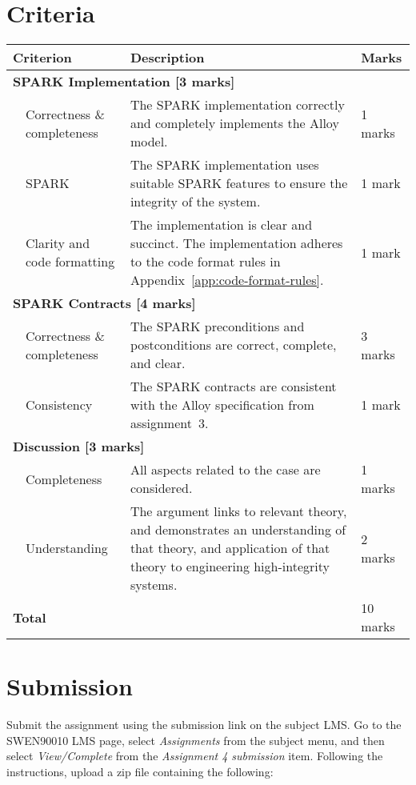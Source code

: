 \documentclass[a4paper,11pt]{article}
\begin{document}
\section{Criteria}

\begin{center}
\begin{tabular}{p{0.5cm}p{3cm}p{10cm}l}
\toprule
 \multicolumn{2}{l}{\textbf{Criterion}} & {\bf Description} & {\bf Marks}\\
\midrule
  \multicolumn{3}{l}{\textbf{SPARK Implementation [3 marks]}}\\
 & Correctness \& completeness & The SPARK implementation correctly and completely implements the Alloy model. & 1 marks\\
 & SPARK & The SPARK implementation uses suitable SPARK features to ensure the integrity of the system. & 1 mark\\
 & Clarity and code formatting & The implementation is clear and succinct. The implementation adheres to the code format rules in Appendix~\ref{app:code-format-rules}. & 1 mark\\[7mm]

  \multicolumn{3}{l}{\textbf{SPARK Contracts [4 marks]}}\\
 & Correctness \& completeness & The SPARK preconditions and postconditions are correct, complete, and clear. & 3 marks\\
 & Consistency & The SPARK contracts are consistent with the Alloy specification from assignment~3. & 1 mark\\[5mm]

  \multicolumn{3}{l}{\textbf{Discussion [3 marks]}}\\
 & Completeness & All aspects related to the case are considered. & 1 marks\\
 & Understanding & The argument links to relevant theory, and demonstrates an understanding of that theory, and application of that theory to engineering high-integrity systems. & 2 marks\\
\midrule
 \multicolumn{2}{l}{\textbf{Total}} && 10 marks\\
\bottomrule
\end{tabular}
\end{center}

\section{Submission}

Submit the assignment using the submission link on the subject LMS. Go to the SWEN90010 LMS page, select {\em Assignments} from the subject menu, and then select {\em View/Complete} from the {\em Assignment 4   submission} item. Following the instructions, upload a zip file containing the following:
\end{document}
